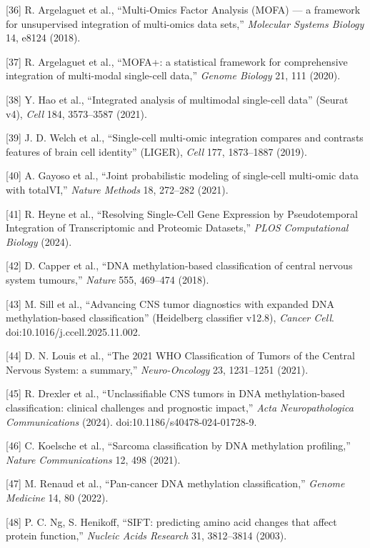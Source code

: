 \documentclass[
]{article}
\begin{document}
{[}36{]} R. Argelaguet et al., ``Multi-Omics Factor Analysis (MOFA) ---
a framework for unsupervised integration of multi-omics data sets,''
\emph{Molecular Systems Biology} 14, e8124 (2018).

{[}37{]} R. Argelaguet et al., ``MOFA+: a statistical framework for
comprehensive integration of multi-modal single-cell data,''
\emph{Genome Biology} 21, 111 (2020).

{[}38{]} Y. Hao et al., ``Integrated analysis of multimodal single-cell
data'' (Seurat v4), \emph{Cell} 184, 3573--3587 (2021).

{[}39{]} J. D. Welch et al., ``Single-cell multi-omic integration
compares and contrasts features of brain cell identity'' (LIGER),
\emph{Cell} 177, 1873--1887 (2019).

{[}40{]} A. Gayoso et al., ``Joint probabilistic modeling of single-cell
multi-omic data with totalVI,'' \emph{Nature Methods} 18, 272--282
(2021).

{[}41{]} R. Heyne et al., ``Resolving Single-Cell Gene Expression by
Pseudotemporal Integration of Transcriptomic and Proteomic Datasets,''
\emph{PLOS Computational Biology} (2024).

{[}42{]} D. Capper et al., ``DNA methylation-based classification of
central nervous system tumours,'' \emph{Nature} 555, 469--474 (2018).

{[}43{]} M. Sill et al., ``Advancing CNS tumor diagnostics with expanded
DNA methylation-based classification'' (Heidelberg classifier v12.8),
\emph{Cancer Cell}. doi:10.1016/j.ccell.2025.11.002.

{[}44{]} D. N. Louis et al., ``The 2021 WHO Classification of Tumors of
the Central Nervous System: a summary,'' \emph{Neuro-Oncology} 23,
1231--1251 (2021).

{[}45{]} R. Drexler et al., ``Unclassifiable CNS tumors in DNA
methylation-based classification: clinical challenges and prognostic
impact,'' \emph{Acta Neuropathologica Communications} (2024).
doi:10.1186/s40478-024-01728-9.

{[}46{]} C. Koelsche et al., ``Sarcoma classification by DNA methylation
profiling,'' \emph{Nature Communications} 12, 498 (2021).

{[}47{]} M. Renaud et al., ``Pan-cancer DNA methylation
classification,'' \emph{Genome Medicine} 14, 80 (2022).

{[}48{]} P. C. Ng, S. Henikoff, ``SIFT: predicting amino acid changes
that affect protein function,'' \emph{Nucleic Acids Research} 31,
3812--3814 (2003).
\end{document}
